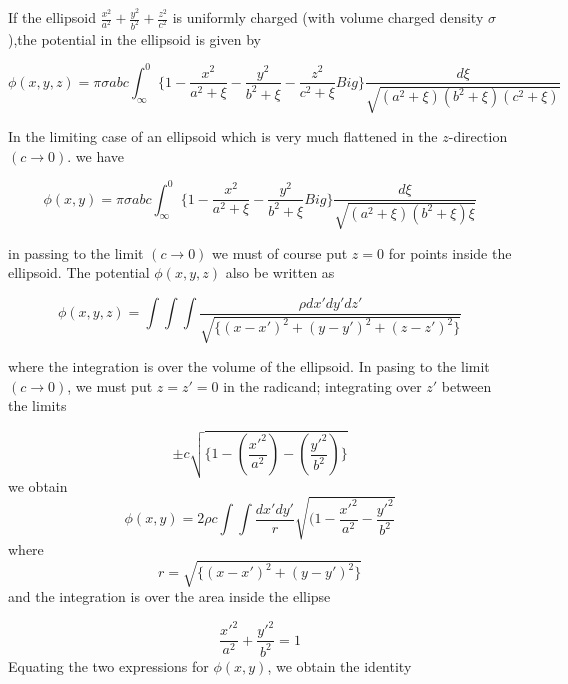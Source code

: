 If the ellipsoid $\frac{x^{2}}{a^{2}}+\frac{y^{2}}{b^{2}}+\frac{z^{2}}{c^{2}}$ is uniformly charged (with volume
charged density $\sigma$),the potential in the ellipsoid is given by


\begin{equation}
\phi(x,y,z) = \pi\sigma abc\int_{\infty}^{0} \Big\{ 1-\frac{x^{2}}{a^{2}+\xi} - \frac{y^{2}}{b^{2}+\xi} - \frac{z^{2}}{c^{2}+\xi} Big\} \frac{d\xi}{\sqrt{(a^{2}+\xi)(b^{2}+\xi)(c^{2}+\xi)}}
\end{equation}
%

In the limiting case of an ellipsoid which is very much flattened in the $z$-direction $(c\rightarrow0)$. we have

\begin{equation}
\phi(x,y) = \pi\sigma abc\int_{\infty}^{0} \Big\{ 1-\frac{x^{2}}{a^{2}+\xi} - \frac{y^{2}}{b^{2}+\xi} Big\} \frac{d\xi}{\sqrt{(a^{2}+\xi)(b^{2}+\xi)\xi}}
\end{equation}

in passing to the limit $(c\rightarrow0)$ we must of course put $z=0$ for points inside the ellipsoid. The potential $\phi(x,y,z)$ also be written as

\begin{equation}
\phi(x,y,z) = \int\int\int\frac{\rho dx'dy'dz'}{\sqrt{\{(x-x')^{2}+(y-y')^{2}+(z-z')^{2}\}}}
\end{equation}

where the integration is over the volume of the ellipsoid. In pasing to the limit $(c\rightarrow0)$, we must put $z=z'=0$ in the radicand; integrating over $z'$ between the limits

\begin{equation}
\pm c \sqrt{\{1-(\frac{x'^{2}}{a^{2}})-(\frac{y'^{2}}{b^{2}})\}}
\end{equation}
we obtain
\begin{equation}
\phi (x,y) = 2\rho c \int\int\frac{dx'dy'}{r}\sqrt{\Big(1-\frac{x'^{2}}{a^{2}} - \frac{y'^{2}}{b^{2}}}
\end{equation}
where
\begin{equation}
r = \sqrt{\{(x-x')^{2}+(y-y')^{2}\}}
\end{equation}
and the integration is over the area inside the ellipse

\begin{equation}
\frac{x'^{2}}{a^{2}} + \frac{y'^{2}}{b^{2}} = 1
\end{equation}
Equating the two expressions for $\phi(x,y)$, we obtain the identity

